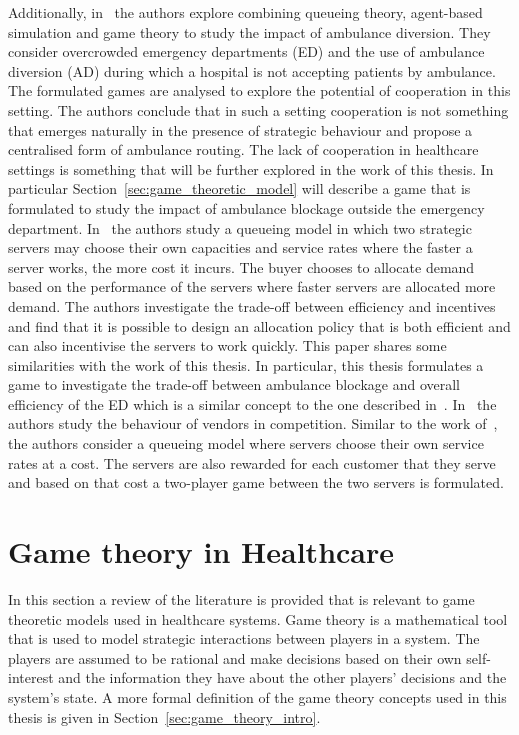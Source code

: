 Additionally, in~\cite{hagtvedt2009cooperative} the authors explore combining
queueing theory, agent-based simulation and game theory to study the impact of
ambulance diversion.
They consider overcrowded emergency departments (ED) and the use of ambulance
diversion (AD) during which a hospital is not accepting patients by ambulance.
The formulated games are analysed to explore the potential of cooperation
in this setting.
The authors conclude that in such a setting cooperation is not something that
emerges naturally in the presence of strategic behaviour and propose a
centralised form of ambulance routing.
The lack of cooperation in healthcare settings is something that will be
further explored in the work of this thesis.
In particular Section~\ref{sec:game_theoretic_model} will describe a game
that is formulated to study the impact of ambulance blockage outside the
emergency department.
In~\cite{cachon2007obtaining} the authors study a queueing model in which two
strategic servers may choose their own capacities and service rates where
the faster a server works, the more cost it incurs.
The buyer chooses to allocate demand based on the performance of the servers
where faster servers are allocated more demand.
The authors investigate the trade-off between efficiency and incentives and
find that it is possible to design an allocation policy that is both efficient
and can also incentivise the servers to work quickly.
This paper shares some similarities with the work of this thesis.
In particular, this thesis formulates a game to investigate the trade-off
between ambulance blockage and overall efficiency of the ED which is a similar
concept to the one described in~\cite{cachon2007obtaining}.
In~\cite{kalai1992optimal} the authors study the behaviour of vendors in
competition.
Similar to the work of~\cite{cachon2007obtaining}, the authors consider a
queueing model where servers choose their own service rates at a cost.
The servers are also rewarded for each customer that they serve and
based on that cost a two-player game between the two servers is formulated.



\section{Game theory in Healthcare}
\label{sec:lit_review_game_theory_in_healthcare}

In this section a review of the literature is provided that is relevant to
game theoretic models used in healthcare systems.
Game theory is a mathematical tool that is used to model strategic interactions
between players in a system.
The players are assumed to be rational and make decisions based on their own
self-interest and the information they have about the other players' decisions
and the system's state.
A more formal definition of the game theory concepts used in this thesis is
given in Section~\ref{sec:game_theory_intro}.

